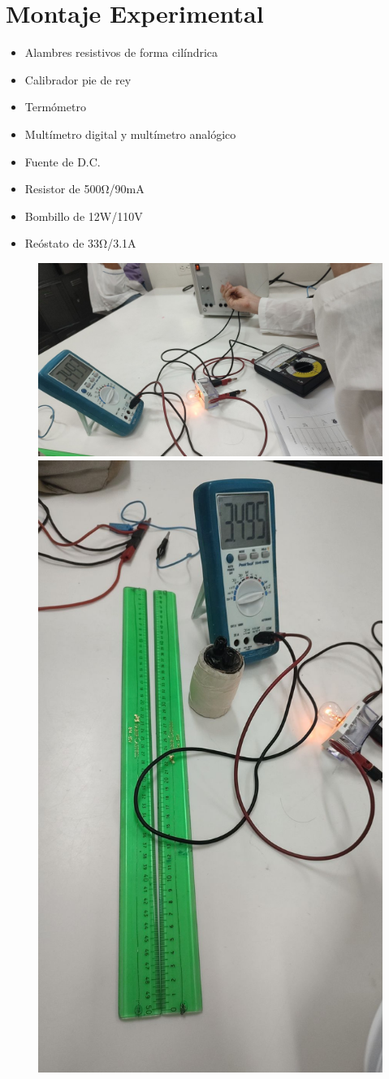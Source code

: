 \documentclass[10pt]{article}
\begin{document}
\section{Montaje Experimental}

\begin{multicols}{2}
	\begin{itemize}
		\item Alambres resistivos de forma cilíndrica
		\item Calibrador pie de rey
		\item Termómetro
		\item Multímetro digital y multímetro analógico
		\item Fuente de D.C.
		\item Resistor de 500Ω/90mA
		\item Bombillo de 12W/110V
		\item Reóstato de 33Ω/3.1A
	\end{itemize}

	\begin{figure}[H]
		\includegraphics[width=\linewidth]{./Images/ME1.jpeg}
		\includegraphics[width=0.5\linewidth]{./Images/ME2.jpeg}
	\end{figure}

\end{multicols}
\end{document}
